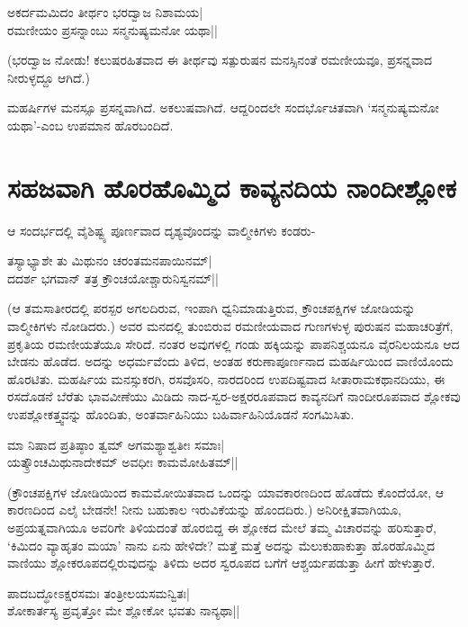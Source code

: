 \begin{shloka} 
ಅಕರ್ದಮಮಿದಂ ತೀರ್ಥಂ ಭರದ್ವಾಜ ನಿಶಾಮಯ|\label{156}\\ 
ರಮಣೀಯಂ ಪ್ರಸನ್ನಾಂಬು ಸನ್ಮನುಷ್ಯಮನೋ ಯಥಾ||
\end{shloka} 

(ಭರದ್ವಾಜ ನೋಡು! ಕಲುಷರಹಿತವಾದ ಈ ತೀರ್ಥವು ಸತ್ಪುರುಷನ ಮನಸ್ಸಿನಂತೆ ರಮಣೀಯವೂ, ಪ್ರಸನ್ನವಾದ ನೀರುಳ್ಳದ್ದೂ ಆಗಿದೆ.) 

ಮಹರ್ಷಿಗಳ ಮನಸ್ಸೂ ಪ್ರಸನ್ನವಾಗಿದೆ. ಅಕಲುಷವಾಗಿದೆ. ಆದ್ದರಿಂದಲೇ ಸಂದರ್ಭೊಚಿತವಾಗಿ `ಸನ್ಮನುಷ್ಯಮನೋ ಯಥಾ'-ಎಂಬ ಉಪಮಾನ ಹೊರಬಂದಿದೆ. 

\section*{ಸಹಜವಾಗಿ ಹೊರಹೊಮ್ಮಿದ ಕಾವ್ಯನದಿಯ ನಾಂದೀಶ್ಲೋಕ} 

ಆ ಸಂದರ್ಭದಲ್ಲಿ ವೈಶಿಷ್ಟ್ಯ ಪೂರ್ಣವಾದ ದೃಶ್ಯವೊಂದನ್ನು ವಾಲ್ಮೀಕಿಗಳು ಕಂಡರು- 

\begin{shloka} 
ತಸ್ಯಾಭ್ಯಾಶೇ ತು ಮಿಥುನಂ ಚರಂತಮನಪಾಯಿನಮ್‍|\label{156a}\\ 
ದದರ್ಶ ಭಗವಾನ್ ತತ್ರ ಕ್ರೌಂಚಯೋಶ್ಚಾರುನಿಸ್ವನಮ್‍||
\end{shloka} 

(ಆ ತಮಸಾತೀರದಲ್ಲಿ ಪರಸ್ಪರ ಅಗಲದಿರುವ, ಇಂಪಾಗಿ ಧ್ವನಿಮಾಡುತ್ತಿರುವ, ಕ್ರೌಂಚಪಕ್ಷಿಗಳ ಜೋಡಿಯನ್ನು ವಾಲ್ಮೀಕಿಗಳು ನೋಡಿದರು.) ಅವರ ಮನದಲ್ಲಿ ತುಂಬಿರುವ ರಮಣೀಯವಾದ ಗುಣಗಳುಳ್ಳ ಪುರುಷನ ಮಹಾಚರಿತ್ರೆಗೆ, ಪ್ರಕೃತಿಯ ರಮಣೀಯತೆಯೂ ಸೇರಿದೆ. ನಂತರ ಅವುಗಳಲ್ಲಿ ಗಂಡು ಹಕ್ಕಿಯನ್ನು ಪಾಪನಿಶ್ಚಯನೂ ವೈರನಿಲಯನೂ ಆದ ಬೇಡನು ಹೊಡೆದ. ಅದನ್ನು ಅಧರ್ಮವೆಂದು ತಿಳಿದ, ಅಂತಹ ಕರುಣಾಪೂರ್ಣನಾದ ಮಹರ್ಷಿಯಿಂದ ವಾಣಿಯೊಂದು ಹೊರಟಿತು. ಮಹರ್ಷಿಯ ಮನಸ್ಸುಕರಗಿ, ರಸವೊಸರಿ, ನಾರದರಿಂದ ಉಪದಿಷ್ಟವಾದ ಸೀತಾರಾಮಕಥಾನದಿಯು, ಈ ರಸದೊಡನೆ ಬೆರೆತು ಭಾವವೀಣೆಯು ಮಿಡಿದು ನಾದ-ಸ್ವರ-ಅಕ್ಷರರೂಪವಾದ ಕಾವ್ಯನದಿಗೆ ನಾಂದೀರೂಪವಾದ ಶ್ಲೋಕವು ಉಪಶ್ಲೋಕತ್ತ್ವವನ್ನು ಹೊಂದಿತು, ಅಂತರ್ವಾಹಿನಿಯು ಬಹಿರ್ವಾಹಿನಿಯೊಡನೆ ಸಂಗಮಿಸಿತು. 

\begin{shloka} 
ಮಾ ನಿಷಾದ ಪ್ರತಿಷ್ಠಾಂ ತ್ವಮ್‍ ಅಗಮಶ್ಯಾಶ್ವತೀಃ ಸಮಾಃ|\label{157b}\\ 
ಯತ್ಕ್ರೌಂಚಮಿಥುನಾದೇಕಮ್‍ ಅವಧೀಃ ಕಾಮಮೋಹಿತಮ್‍||
\end{shloka} 

(ಕ್ರೌಂಚಪಕ್ಷಿಗಳ ಜೋಡಿಯಿಂದ ಕಾಮಮೋಯಿತವಾದ ಒಂದನ್ನು ಯಾವಕಾರಣದಿಂದ ಹೊಡೆದು ಕೊಂದೆಯೋ, ಆ ಕಾರಣದಿಂದ ಎಲೈ ಬೇಡನೇ! ನೀನು ಬಹುಕಾಲ ಇರುವಿಕೆಯನ್ನು ಹೊಂದದಿರು.) ಅನಿರೀಕ್ಷಿತವಾಗಿಯೂ, ಅಪ್ರಯತ್ನವಾಗಿಯೂ ಅವರಿಗೇ ತಿಳಿಯದಂತೆ ಹೊರಬಿದ್ದ ಈ ಶ್ಲೋಕದ ಮೇಲೆ ತಮ್ಮ ವಿಚಾರವನ್ನು ಹರಿಸುತ್ತಾರೆ, `ಕಿಮಿದಂ ವ್ಯಾಹೃತಂ ಮಯಾ'\label{157} ನಾನು ಏನು ಹೇಳಿದೇ? ಮತ್ತೆ ಮತ್ತೆ ಅದನ್ನು ಮೆಲುಕುಹಾಕುತ್ತಾ ಹೊರಹೊಮ್ಮಿದ ವಾಣಿಯು ಶ್ಲೋಕರೂಪದಲ್ಲಿರುವುದನ್ನು ತಿಳಿದು ಅದರ ಸ್ವರೂಪದ ಬಗೆಗೆ ಆಶ್ಚರ್ಯಪಡುತ್ತಾ ಹೀಗೆ ಹೇಳುತ್ತಾರೆ. 

\begin{shloka} 
ಪಾದಬದ್ಧೋಽಕ್ಷರಸಮಃ ತಂತ್ರೀಲಯಸಮನ್ವಿತಃ|\label{157a}\\ 
ಶೋಕಾರ್ತಸ್ಯ ಪ್ರವೃತ್ತೋ ಮೇ ಶ್ಲೋಕೋ ಭವತು ನಾನ್ಯಥಾ||
\end{shloka}

